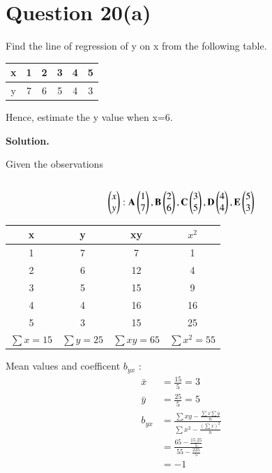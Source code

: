 \documentclass[journal,12pt,twocolumn]{IEEEtran}
\begin{document}
\section{Question 20(a)} 
	Find the line of regression of y on x from the following table.
\begin{table}[H]
	\resizebox{\columnwidth}{!} {
		\begin{tabular}{|c|c|c|c|c|c|}
			\hline
        x &1 &2&3 & 4& 5 \\
         \hline
        y &7 & 6 & 5 &4 & 3\\
        \hline
		\end{tabular}
	}
\end{table}
		Hence, estimate the y value when x=6.
		
\textbf{Solution.}

Given the observations \\\\
\begin{align}
\begin{pmatrix}x \\y \end{pmatrix}:
\mathbf{A}\begin{pmatrix}1 \\7 \end{pmatrix},
\mathbf {B}\begin{pmatrix}2 \\6 \end{pmatrix},
\mathbf {C}\begin{pmatrix}3 \\5 \end{pmatrix},
 \mathbf {D}\begin{pmatrix}4 \\4 \end{pmatrix},
\mathbf {E}\begin{pmatrix}5 \\3 \end{pmatrix}
\end{align}
\begin{table}[H]
	\resizebox{\columnwidth}{!} {
		\begin{tabular}{|c|c|c|c|}
			\hline
			x & y & xy & $x^{2}$ \\
			\hline
			1 &  7 & 7  &1 \\
		
				2 &  6 & 12   &4 \\
			
				3 &  5 & 15  &9 \\
			
				4 &  4 & 16  &16 \\
			
				5 &  3 & 15  &25 \\
			\hline
			$\sum x=15$ &$\sum  y=25$ &$\sum xy=65$  &$\sum x^2=55$  \\
			\hline
		\end{tabular}
	}
\end{table}
Mean values and coefficent $b_{yx}$ :
\begin{align}
	\bar{x}&=\frac{15}{5}=3\\
	\bar{y}&=\frac{25}{5}=5\\
	b_{yx} &=\frac{\sum xy - \frac{\sum x \sum y}{n}}{\sum x^{2}- \frac {(\sum x)^{2}}{n} }\\
	&=\frac{65 -\frac{15.25}{5}}{55-\frac{225}{5}}\\
	&= -1 
\end{align}
\end{document}
